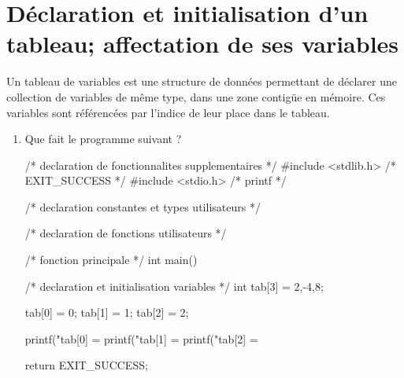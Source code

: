 \section{Déclaration et initialisation d'un tableau; affectation de ses variables}
\label{intro}

Un tableau de variables est une structure de données permettant de déclarer une collection de variables de même type, dans une zone contigüe en mémoire. Ces variables sont référencées par l'indice de leur place dans le tableau.

\begin{enumerate}
\item Que fait le programme suivant ?
\begin{listing}{1}
/* declaration de fonctionnalites supplementaires */
#include <stdlib.h> /* EXIT_SUCCESS */
#include <stdio.h> /* printf */

/* declaration constantes et types utilisateurs */

/* declaration de fonctions utilisateurs */

/* fonction principale */
int main()
{
    /* declaration et initialisation variables */
    int tab[3] = {2,-4,8};

    tab[0] = 0;
    tab[1] = 1;
    tab[2] = 2;

    printf("tab[0] = %
    printf("tab[1] = %
    printf("tab[2] = %

    return EXIT_SUCCESS;
}


\end{listing}
\end{enumerate}
